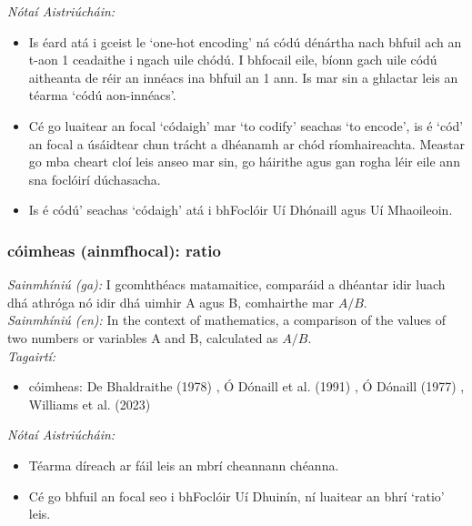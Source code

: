  \noindent \textit{Nótaí Aistriúcháin:}
\begin{itemize}
	\item Is éard atá i gceist le `one-hot encoding' ná códú dénártha nach bhfuil ach an t-aon 1 ceadaithe i ngach uile chódú. I bhfocail eile, bíonn gach uile códú aitheanta de réir an innéacs ina bhfuil an 1 ann. Is mar sin a ghlactar leis an téarma `códú aon-innéacs'.
	\item Cé go luaitear an focal `códaigh' mar `to codify' seachas `to encode', is é `cód' an focal a úsáidtear chun trácht a dhéanamh ar chód ríomhaireachta. Meastar go mba cheart cloí leis anseo mar sin, go háirithe agus gan rogha léir eile ann sna foclóirí dúchasacha.
	\item Is é códú' seachas `códaigh' atá i bhFoclóir Uí Dhónaill agus Uí Mhaoileoin.
\end{itemize}


\subsubsection*{cóimheas (ainmfhocal): ratio}
 \noindent \textit{Sainmhíniú (ga):} I gcomhthéacs matamaitice, comparáid a dhéantar idir luach dhá athróga nó idir dhá uimhir A agus B, comhairthe mar $A / B$.
\\
 \noindent \textit{Sainmhíniú (en):} In the context of mathematics, a comparison of the values of two numbers or variables A and B, calculated as $A / B$.
\\
 \noindent \textit{Tagairtí:}
\begin{itemize}
	\item cóimheas: De Bhaldraithe (1978) \cite{de-bhaldraithe}, Ó Dónaill et al. (1991) \cite{focloir-beag}, Ó Dónaill (1977) \cite{odonaill}, Williams et al. (2023) \cite{storchiste}
\end{itemize}

 \noindent \textit{Nótaí Aistriúcháin:}
\begin{itemize}
	\item Téarma díreach ar fáil leis an mbrí cheannann chéanna.
	\item Cé go bhfuil an focal seo i bhFoclóir Uí Dhuinín, ní luaitear an bhrí `ratio' leis.
\end{itemize}


